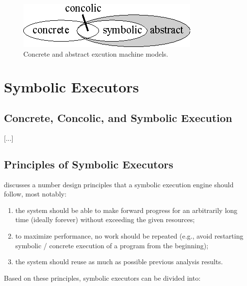 
\begin{figure}[t]
\centering
\includegraphics[width=0.35\columnwidth]{images/concrete-abstract.eps} 
\caption{Concrete and abstract excution machine models.}
\label{fig:concrete-symbolic}
\end{figure}

\section{Symbolic Executors}

\subsection{Concrete, Concolic, and Symbolic Execution}
\label{ss:concrete-concolic-symbolic}

[...]

\subsection{Principles of Symbolic Executors}
\label{ss:principles}

\cite{MAYHEM-SP12} discusses a number design principles that a symbolic execution engine should follow, most notably: 
\begin{enumerate}
  \item the system should be able to make forward progress for an arbitrarily long time (ideally forever) without exceeding the given resources;
  \item to maximize performance, no work should be repeated (e.g., avoid restarting symbolic / concrete execution of a program from the beginning);
  \item the system should reuse as much as possible previous analysis results.
\end{enumerate}

\noindent Based on these principles, symbolic executors can be divided into:

